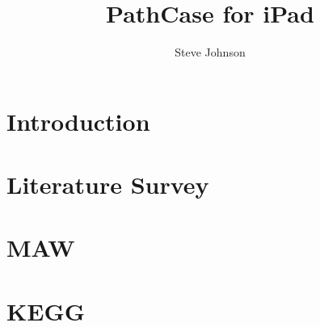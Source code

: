 \documentclass[twocolumn, 12pt]{report}
\title{PathCase for iPad}
\author{Steve Johnson}
\begin{document}
\maketitle

\tableofcontents

\chapter{Introduction}
\label{ch:introduction}


\chapter{Literature Survey}
\label{ch:literature_survey}


\chapter{MAW}
\label{ch:maw_smda}


\chapter{KEGG}
\label{ch:kegg}


\nocite{*}


\end{document}
